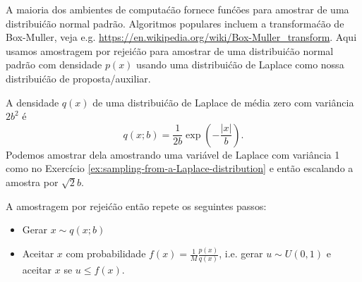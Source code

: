 \label{ex:rejection-sampling-alt}
A maioria dos ambientes de computa\'c\~ao fornece fun\'c\~oes para amostrar de uma distribui\'c\~ao
normal padr\~ao. Algoritmos populares incluem a transforma\'c\~ao de
Box-Muller, veja
e.g. \url{https://en.wikipedia.org/wiki/Box-Muller_transform}. Aqui
usamos amostragem por rejei\'c\~ao para amostrar de uma distribui\'c\~ao normal
padr\~ao com densidade $p(x)$ usando uma distribui\'c\~ao de Laplace como nossa
distribui\'c\~ao de proposta/auxiliar.

A densidade $q(x)$ de uma distribui\'c\~ao de Laplace de m\'edia zero com vari\^ancia
$2b^2$ \'e
\begin{equation}
    q(x;b) = \frac{1}{2b}\exp\left(-\frac{|x|}{b}\right).
\end{equation}
Podemos amostrar dela amostrando uma vari\'avel de Laplace com vari\^ancia 1
como no Exerc\'icio \ref{ex:sampling-from-a-Laplace-distribution} e ent\~ao
escalando a amostra por $\sqrt{2}b$.

A amostragem por rejei\'c\~ao ent\~ao repete os seguintes passos:
\begin{itemize}
    \item Gerar $x \sim q(x; b)$
    \item Aceitar $x$ com probabilidade $f(x) = \frac{1}{M}
    \frac{p(x)}{q(x)}$, i.e. gerar $u \sim U(0,1)$ e aceitar $x$
    se $u \le f(x)$.
\end{itemize}

